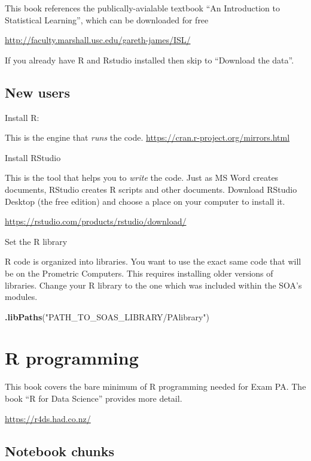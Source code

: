 \documentclass[openany]{book}
\newenvironment{Shaded}{\begin{snugshade}}{\end{snugshade}}
\newcommand{\KeywordTok}[1]{\textcolor[rgb]{0.13,0.29,0.53}{\textbf{#1}}}
\newcommand{\NormalTok}[1]{#1}
\newcommand{\StringTok}[1]{\textcolor[rgb]{0.31,0.60,0.02}{#1}}
\begin{document}
This book references the publically-avialable textbook ``An Introduction to Statistical Learning'', which can be downloaded for free

\url{http://faculty.marshall.usc.edu/gareth-james/ISL/}

If you already have R and Rstudio installed then skip to ``Download the data''.

\hypertarget{new-users}{%
\section{New users}\label{new-users}}

Install R:

This is the engine that \emph{runs} the code. \url{https://cran.r-project.org/mirrors.html}

Install RStudio

This is the tool that helps you to \emph{write} the code. Just as MS Word creates documents, RStudio creates R scripts and other documents. Download RStudio Desktop (the free edition) and choose a place on your computer to install it.

\url{https://rstudio.com/products/rstudio/download/}

Set the R library

R code is organized into libraries. You want to use the exact same code that will be on the Prometric Computers. This requires installing older versions of libraries. Change your R library to the one which was included within the SOA's modules.

\begin{Shaded}
\begin{Highlighting}[]
\KeywordTok{.libPaths}\NormalTok{(}\StringTok{"PATH_TO_SOAS_LIBRARY/PAlibrary"}\NormalTok{)}
\end{Highlighting}
\end{Shaded}

\hypertarget{r-programming}{%
\chapter{R programming}\label{r-programming}}

This book covers the bare minimum of R programming needed for Exam PA. The book ``R for Data Science'' provides more detail.

\url{https://r4ds.had.co.nz/}

\hypertarget{notebook-chunks}{%
\section{Notebook chunks}\label{notebook-chunks}}
\end{document}
